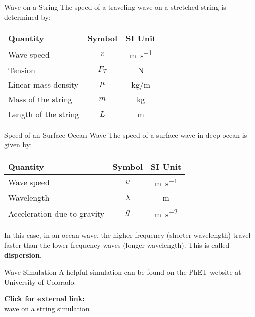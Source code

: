 \documentclass[12pt,aspectratio=169]{beamer}
\newcommand{\eq}[2]{\vspace{#1}{\Large\begin{displaymath}#2\end{displaymath}}}
\begin{document}
\begin{frame}{Wave on a String}
  The speed of a traveling wave on a stretched string is determined by:
  
  \eq{-.2in}{
    \boxed{v=\sqrt{\frac{F_T}{\mu}}}
    \quad\text{\normalsize where}\quad
    \boxed{\mu=\frac{m}{L}}
  }
  \begin{center}
    \begin{tabular}{l|c|c}
      \rowcolor{pink}
      \textbf{Quantity} & \textbf{Symbol} & \textbf{SI Unit} \\ \hline
      Wave speed           & $v$   & \si{\metre\per\second} \\
      Tension              & $F_T$ & \si{\newton} \\
      Linear mass density  & $\mu$ & \si{\kilo\gram/\metre} \\
      Mass of the string   & $m$   & \si{\kilo\gram} \\
      Length of the string & $L$   & \si{\metre}
    \end{tabular}
  \end{center}
\end{frame}



\begin{frame}{Speed of an Surface Ocean Wave}
  The speed of a surface wave in deep ocean is given by:
  
  \eq{-.2in}{
    \boxed{v=\sqrt{\frac{\lambda g}{2\pi}}}
  }
  \begin{center}
    \begin{tabular}{l|c|c}
      \rowcolor{pink}
      \textbf{Quantity} & \textbf{Symbol} & \textbf{SI Unit} \\ \hline
      Wave speed           & $v$       & \si{\metre\per\second} \\
      Wavelength           & $\lambda$ & \si{\metre} \\
      Acceleration due to gravity & $g$ & \si{\metre\per\second^2}
    \end{tabular}
  \end{center}
  In this case, in an ocean wave, the higher frequency (shorter wavelength)
  travel faster than the lower frequency waves (longer wavelength). This is
  called \textbf{dispersion}.
\end{frame}





\begin{frame}{Wave Simulation}
  A helpful simulation can be found on the PhET website at University of
  Colorado.
  \begin{center}
    \textbf{Click for external link:}\\
    \href{https://phet.colorado.edu/sims/html/wave-on-a-string/latest/wave-on-a-string_en.html}
         {wave on a string simulation}
  \end{center}
\end{frame}
\end{document}

